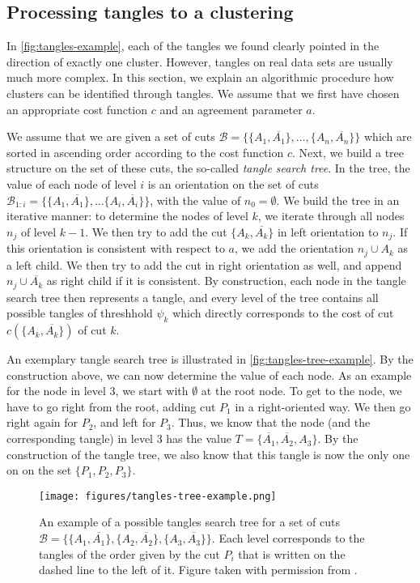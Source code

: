 \subsection{Processing tangles to a clustering}
In \autoref{fig:tangles-example}, each of the tangles we found clearly pointed in the direction 
of exactly one cluster. However, tangles on real data sets
are usually much more complex. In this section, we explain an algorithmic procedure how clusters 
can be identified through tangles. We assume that we first have chosen an appropriate
cost function $c$ and an agreement parameter $a$. 

We assume that we are given a set of cuts $\mathcal{B} = \{\{A_1, \overline{A_1}\}, \ldots, 
\{A_n, \overline{A_n}\}\} $ which are sorted in  
ascending order according to the cost function $c$.  Next, we build a tree structure
on the set of these cuts, the so-called \textit{tangle search tree}. 
In the tree, the value of each node of level $i$ is an orientation on the set of cuts $\mathcal{B}_{1:i} = \{\{A_1, \overline{A_1}\}, \ldots \{A_i, \overline{A_i}\}\}$, with the value of $n_0 = \emptyset$.
We build the tree in an iterative manner: to determine the nodes of level $k$, we 
iterate through all nodes $n_j$ of level $k-1$. 
We then try to add the cut $\{A_k, \overline{A_k}\}$ in left orientation to $n_j$. If this
orientation is consistent with respect to $a$, we add the orientation $n_j \cup A_k$ as a left child. 
We then try to add the cut in right orientation as well, and append $n_j \cup \overline{A_k}$ as right child if it is consistent.
By construction, each node in the tangle search tree then represents a tangle, and 
every level of the tree contains all possible tangles of threshhold $\psi_k$ which directly corresponds to the cost of cut $c(\{A_k, \overline{A_k}\})$ of cut $k$. 

An exemplary tangle search tree is illustrated in \autoref{fig:tangles-tree-example}. 
By the construction above, we can now determine the value of each node. 
As an example for the node in level 3, we start with $\emptyset$ at the root node. To
get to the node, we have to go right from the root, adding cut $P_1$ in a right-oriented
way. We then go right again for $P_2$, and left for $P_3$. Thus, we know that the node (and the 
corresponding tangle) in level 3 has the value $T = \{\overline{A_1}, \overline{A_2}, A_3\}$. 
By the construction of the tangle tree, we also know that this tangle is now the only one on
on the set $\{P_1, P_2, P_3\}$.


\begin{figure}[h]
    \centering
    \texttt{[image: figures/tangles-tree-example.png]}
    \caption{An example of a possible tangles search tree for a set of cuts $\mathcal{B} = \{\{A_1, \overline{A_1}\}, \{A_2, \overline{A_2}\}, \{A_3, \overline{A_3}\} \}$. 
        Each level corresponds to the tangles of the order given by the cut $P_i$ that is written on the dashed line to the left of it.
        Figure taken with permission from \cite{klepperClusteringTanglesAlgorithmic2021}.}
    \label{fig:tangles-tree-example}
\end{figure}

